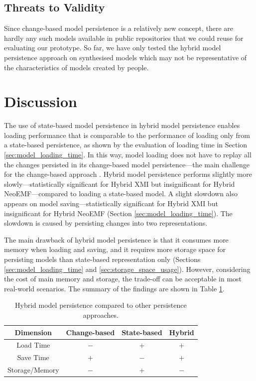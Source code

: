 \subsection{Threats to Validity}
\label{sec:threats_to_validity_6}
Since change-based model persistence is a relatively new concept, there are hardly any such models available in public repositories that we could reuse for evaluating our prototype. So far, we have only tested the hybrid model persistence approach on synthesised models which may not be representative of the characteristics of models created by people.

\section{Discussion}
\label{sec:discussion_5}
The use of state-based model persistence in hybrid model persistence enables loading performance that is comparable to the performance of loading only from a state-based persistence, as shown by the evaluation of loading time in Section \ref{sec:model_loading_time}. In this way, model loading does not have to replay all the changes persisted in its change-based model persistence—the main challenge for the change-based approach \cite{yohannis2018towards, mens2002state}. Hybrid model persistence performs slightly more slowly—statistically significant for Hybrid XMI but insignificant for Hybrid NeoEMF—compared to loading a state-based model. A slight slowdown also appears on model saving—statistically significant for Hybrid XMI but insignificant for Hybrid NeoEMF (Section \ref{sec:model_loading_time}). The slowdown is caused by persisting changes into two representations.

The main drawback of hybrid model persistence is that it consumes more memory when loading and saving, and it requires more storage space for persisting models than state-based representation only (Sections \ref{sec:model_loading_time} and \ref{sec:storage_space_usage}). However, considering the cost of main memory and storage, the trade-off can be acceptable in most real-world scenarios. The summary of the findings are shown in Table \ref{table:persistence_comparison_conclusion}.

\begin{table}[ht]
  \caption{Hybrid model persistence compared to other persistence approaches.}
  \label{table:persistence_comparison_conclusion}
  \centering
  \begin{small}
    \begin{tabular}{ c c c c }
      \hline
      \textbf{Dimension} & \textbf{Change-based} & \textbf{State-based} & \textbf{Hybrid} \\
      \hline
      Load Time & $-$ & $+$ & $+$ \\
      Save Time & $+$ & $-$ & $+$ \\
      Storage/Memory & $-$ & $+$ & $-$ \\
      \hline
    \end{tabular}
  \end{small}
\end{table}

